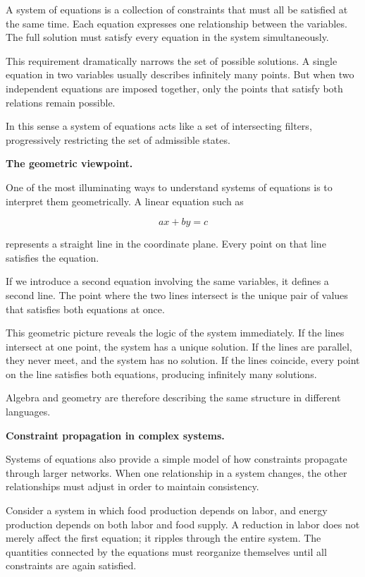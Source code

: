 \documentclass[11pt, openany]{book}
\theoremstyle{plain}
\theoremstyle{definition}
\theoremstyle{remark}
\begin{document}
A system of equations is a collection of constraints that must all be
satisfied at the same time. Each equation expresses one relationship
between the variables. The full solution must satisfy every equation in
the system simultaneously.

This requirement dramatically narrows the set of possible solutions. A
single equation in two variables usually describes infinitely many
points. But when two independent equations are imposed together, only
the points that satisfy both relations remain possible.

In this sense a system of equations acts like a set of intersecting
filters, progressively restricting the set of admissible states.

\medskip

\textbf{The geometric viewpoint.}

One of the most illuminating ways to understand systems of equations is
to interpret them geometrically. A linear equation such as

\[
ax + by = c
\]

represents a straight line in the coordinate plane. Every point on that
line satisfies the equation.

If we introduce a second equation involving the same variables, it
defines a second line. The point where the two lines intersect is the
unique pair of values that satisfies both equations at once.

This geometric picture reveals the logic of the system immediately. If
the lines intersect at one point, the system has a unique solution. If
the lines are parallel, they never meet, and the system has no solution.
If the lines coincide, every point on the line satisfies both equations,
producing infinitely many solutions.

Algebra and geometry are therefore describing the same structure in
different languages.

\medskip

\textbf{Constraint propagation in complex systems.}

Systems of equations also provide a simple model of how constraints
propagate through larger networks. When one relationship in a system
changes, the other relationships must adjust in order to maintain
consistency.

Consider a system in which food production depends on labor, and energy
production depends on both labor and food supply. A reduction in labor
does not merely affect the first equation; it ripples through the entire
system. The quantities connected by the equations must reorganize
themselves until all constraints are again satisfied.
\end{document}
